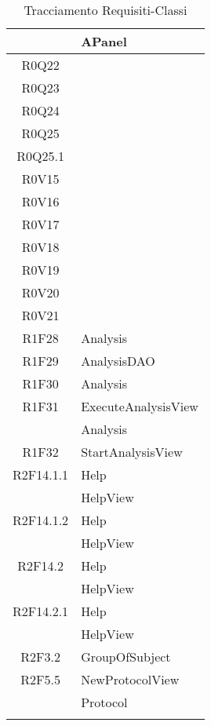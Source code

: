 \begin{center}
\begin{longtable}{|c|l|}
 & APanel \\ 
\hline
R0Q22 & \\ 
\hline
R0Q23 & \\ 
\hline
R0Q24 & \\ 
\hline
R0Q25 & \\ 
\hline
R0Q25.1 & \\ 
\hline
R0V15 & \\ 
\hline
R0V16 & \\ 
\hline
R0V17 & \\ 
\hline
R0V18 & \\ 
\hline
R0V19 & \\ 
\hline
R0V20 & \\ 
\hline
R0V21 & \\ 
\hline
R1F28 & Analysis \\ 
\hline
R1F29 & AnalysisDAO \\ 
\hline
R1F30 & Analysis \\ 
\hline
R1F31 & ExecuteAnalysisView \\ 
 & Analysis \\ 
\hline
R1F32 & StartAnalysisView \\ 
\hline
R2F14.1.1 & Help \\ 
 & HelpView \\ 
\hline
R2F14.1.2 & Help \\ 
 & HelpView \\ 
\hline
R2F14.2 & Help \\ 
 & HelpView \\ 
\hline
R2F14.2.1 & Help \\ 
 & HelpView \\ 
\hline
R2F3.2 & GroupOfSubject \\ 
\hline
R2F5.5 & NewProtocolView \\ 
 & Protocol \\ 
\hline
\caption{Tracciamento Requisiti-Classi}
\end{longtable}
\end{center}
